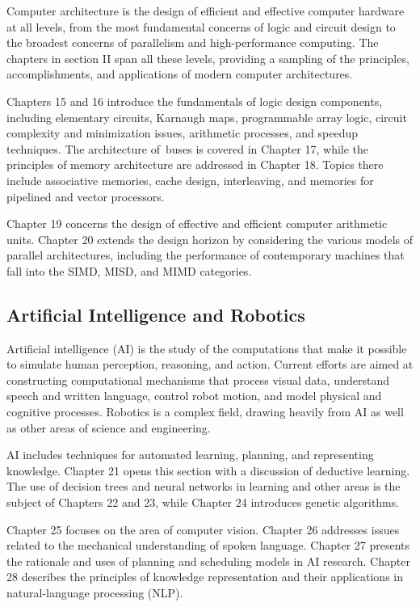 Computer architecture is the design of efficient and effective
computer hardware at all levels, from the most fundamental
concerns of logic and circuit design to the broadest concerns of
parallelism and high-performance computing. The chapters in section II
span all these levels, providing a sampling of the
principles, accomplishments, and applications of modern computer
architectures.

Chapters 15 and 16 introduce the fundamentals of logic design
components, including elementary circuits, Karnaugh maps,
programmable array logic, circuit complexity and minimization
issues, arithmetic processes, and speedup techniques. The
architecture of\, buses is covered in  Chapter 17, while the
principles of memory architecture are addressed in Chapter 18.
Topics there include associative memories, cache design,
interleaving, and memories for pipelined and vector processors.

Chapter 19 concerns the design of effective and efficient computer
arithmetic units. Chapter 20 extends the design horizon by
considering the various models of parallel architectures,
including the performance of contemporary machines that fall
into the SIMD, MISD, and MIMD categories.

\subsection{Artificial Intelligence and Robotics}

Artificial intelligence (AI) is the study of the computations
that make it possible to simulate human perception, reasoning,
and action. Current efforts are aimed at constructing
computational mechanisms that process visual data, understand
speech and written language, control robot motion, and model
physical and cognitive processes. Robotics is a complex field,
drawing heavily from AI as well as other areas of science and engineering.

AI includes techniques for automated learning, planning, and
representing knowledge. Chapter 21 opens this section with a
discussion of deductive learning. The use of decision trees and
neural networks in learning and other areas is the subject of
Chapters 22 and 23, while Chapter 24 introduces genetic algorithms.

Chapter 25 focuses on the area of computer vision. Chapter
26 addresses issues related to the mechanical understanding
of spoken language. Chapter
27 presents the rationale and uses of planning and scheduling
models in AI research. Chapter 28 describes the principles of
knowledge representation and their applications in natural-language
 processing (NLP).

